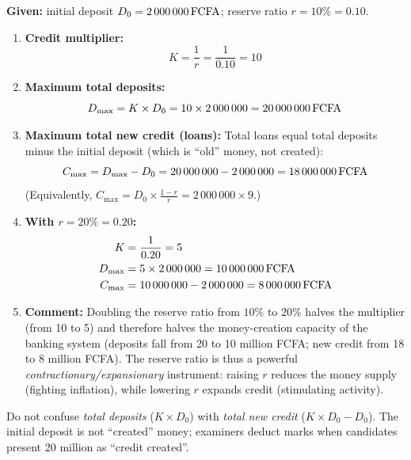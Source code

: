 \documentclass[11pt]{article}
\begin{document}
\begin{corrige}

\textbf{Given:} initial deposit $D_0 = \SI{2\,000\,000}{FCFA}$; reserve ratio $r = 10\% = 0.10$.

\begin{enumerate}
\item \textbf{Credit multiplier:}
\[ K = \frac{1}{r} = \frac{1}{0.10} = 10 \]

\item \textbf{Maximum total deposits:}
\[ D_{\max} = K \times D_0 = 10 \times 2\,000\,000 = \SI{20\,000\,000}{FCFA} \]

\item \textbf{Maximum total new credit (loans):} Total loans equal total deposits minus the initial deposit (which is ``old'' money, not created):
\[ C_{\max} = D_{\max} - D_0 = 20\,000\,000 - 2\,000\,000 = \SI{18\,000\,000}{FCFA} \]
(Equivalently, $C_{\max} = D_0 \times \frac{1-r}{r} = 2\,000\,000 \times 9$.)

\item \textbf{With $r = 20\% = 0.20$:}
\begin{align*}
K &= \frac{1}{0.20} = 5 \\
D_{\max} &= 5 \times 2\,000\,000 = \SI{10\,000\,000}{FCFA} \\
C_{\max} &= 10\,000\,000 - 2\,000\,000 = \SI{8\,000\,000}{FCFA}
\end{align*}

\item \textbf{Comment:} Doubling the reserve ratio from $10\%$ to $20\%$ halves the multiplier (from 10 to 5) and therefore halves the money-creation capacity of the banking system (deposits fall from 20 to 10 million FCFA; new credit from 18 to 8 million FCFA). The reserve ratio is thus a powerful \emph{contractionary/expansionary} instrument: raising $r$ reduces the money supply (fighting inflation), while lowering $r$ expands credit (stimulating activity).
\end{enumerate}

\begin{attention}
Do not confuse \emph{total deposits} ($K \times D_0$) with \emph{total new credit} ($K \times D_0 - D_0$). The initial deposit is not ``created'' money; examiners deduct marks when candidates present 20 million as ``credit created''.
\end{attention}
\end{corrige}
\end{document}
